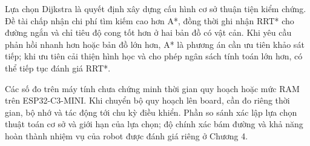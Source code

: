 Lựa chọn Dijkstra là quyết định xây dựng cấu hình cơ sở thuận tiện kiểm chứng. Đề tài chấp nhận chi phí tìm kiếm cao hơn A*, đồng thời ghi nhận RRT* cho đường ngắn và chỉ tiêu độ cong tốt hơn ở hai bản đồ có vật cản. Khi yêu cầu phản hồi nhanh hơn hoặc bản đồ lớn hơn, A* là phương án cần ưu tiên khảo sát tiếp; khi ưu tiên cải thiện hình học và cho phép ngân sách tính toán lớn hơn, có thể tiếp tục đánh giá RRT*.

Các số đo trên máy tính chưa chứng minh thời gian quy hoạch hoặc mức RAM trên ESP32-C3-MINI. Khi chuyển bộ quy hoạch lên board, cần đo riêng thời gian, bộ nhớ và tác động tới chu kỳ điều khiển. Phần so sánh xác lập lựa chọn thuật toán cơ sở và giới hạn của lựa chọn; độ chính xác bám đường và khả năng hoàn thành nhiệm vụ của robot được đánh giá riêng ở Chương 4.

